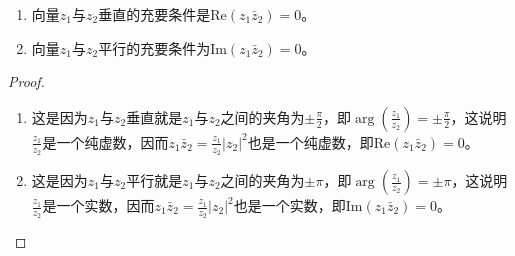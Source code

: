 \documentclass[../../main.tex]{subfiles}
\begin{document}
\begin{proposition}\label{proposition:复平面向量垂直与平行的充要条件}
\begin{enumerate}[(1)]
\item 向量\(z_1\)与\(z_2\)垂直的充要条件是\(\mathrm{Re}(z_1\bar{z}_2) = 0\)。

\item 向量\(z_1\)与\(z_2\)平行的充要条件为\(\mathrm{Im}(z_1\bar{z}_2) = 0\)。
\end{enumerate}
\end{proposition}
\begin{proof}
\begin{enumerate}[(1)]
\item 这是因为\(z_1\)与\(z_2\)垂直就是\(z_1\)与\(z_2\)之间的夹角为\(\pm \frac{\pi}{2}\)，即\(\arg\left( \frac{z_1}{z_2} \right) = \pm \frac{\pi}{2}\)，这说明\(\frac{z_1}{z_2}\)是一个纯虚数，因而\(z_1\bar{z}_2 = \frac{z_1}{z_2}|z_2|^2\)也是一个纯虚数，即\(\mathrm{Re}(z_1\bar{z}_2) = 0\)。

\item 这是因为\(z_1\)与\(z_2\)平行就是\(z_1\)与\(z_2\)之间的夹角为\(\pm \pi\)，即\(\arg\left( \frac{z_1}{z_2} \right) = \pm \pi\)，这说明\(\frac{z_1}{z_2}\)是一个实数，因而\(z_1\bar{z}_2 = \frac{z_1}{z_2}|z_2|^2\)也是一个实数，即\(\mathrm{Im}(z_1\bar{z}_2) = 0\)。
\end{enumerate}
\end{proof}
\end{document}
